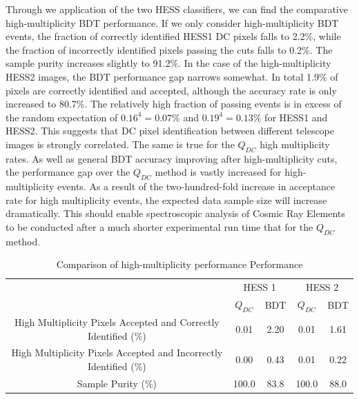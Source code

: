 \documentclass{article}
\begin{document}
Through we application of the two HESS classifiers, we can find the comparative high-multiplicity BDT performance. If we only consider high-multiplicity BDT events, the fraction of correctly identified HESS1 DC pixels falls to 2.2\%, while the fraction of incorrectly identified pixels passing the cuts falls to 0.2\%. The sample purity increases slightly to 91.2\%. In the case of the high-multiplicity HESS2 images, the BDT performance gap narrows somewhat. In total 1.9\% of pixels are correctly identified and accepted, although the accuracy rate is only increased to 80.7\%. The relatively high fraction of passing events is in excess of the random expectation of $0.16^{4}=0.07\%$ and $0.19^{4}=0.13\%$ for HESS1 and HESS2. This suggests that DC pixel identification between different telescope images is strongly correlated. The same is true for the $Q_{DC}$ high multiplicity rates. As well as general BDT accuracy improving after high-multiplicity cuts, the performance gap over the $Q_{DC}$ method is vastly increased for high-multiplicity events. As a result of the two-hundred-fold increase in acceptance rate for high multiplicity events, the expected data sample size will increase dramatically. This should enable spectroscopic analysis of Cosmic Ray Elements to be conducted after a much shorter experimental run time that for the $Q_{DC}$ method.

\begin{table}[h!]
  \centering
  \caption{Comparison of high-multiplicity performance Performance}
  \label{tab:highmultiplicitycomparison}
  \begin{tabular}{c|cc|cc}
    \toprule
    & \multicolumn{2}{c|}{HESS 1} & \multicolumn{2}{c}{HESS 2} \\
    & $Q_{DC}$ & BDT & $Q_{DC}$ & BDT\\
    \midrule
    High Multiplicity Pixels Accepted and Correctly Identified (\%)& 0.01 & 2.20 & 0.01 & 1.61\\
    High Multiplicity Pixels Accepted and Incorrectly Identified (\%)  & 0.00 & 0.43 & 0.01 & 0.22\\
    Sample Purity (\%)& 100.0 & 83.8 & 100.0 & 88.0\\
    \bottomrule
  \end{tabular}
\end{table}
\end{document}
